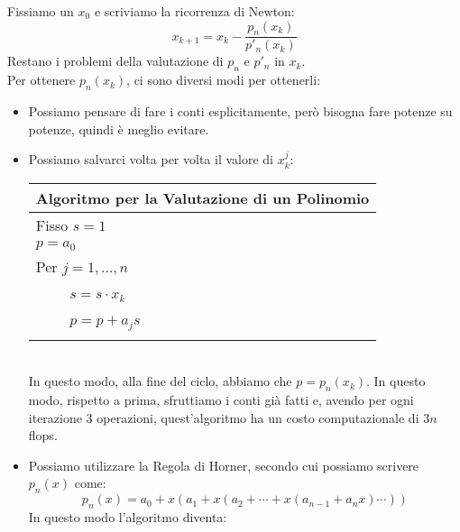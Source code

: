 \documentclass[11pt,a4paper,twoside]{article}
\theoremstyle{definition}
\begin{document}
Fissiamo un $x_0$ e scriviamo la ricorrenza di Newton:
\[ x_{k+1} = x_k - \frac{p_n(x_k)}{p'_n(x_k)} \]
Restano i problemi della valutazione di $p_n$ e $p'_n$ in $x_k$.\\
Per ottenere $p_n(x_k)$, ci sono diversi modi per ottenerli:
\begin{itemize}
	\item Possiamo pensare di fare i conti esplicitamente, però bisogna fare potenze su potenze, quindi è meglio evitare.
	\item Possiamo salvarci volta per volta il valore di $x_k^j$:

		\begin{tabular}{l}
		\\
		\textbf{Algoritmo per la Valutazione di un Polinomio}\\
		\hline
		Fisso $s = 1$\\
		$p = a_0$\\
		Per $j = 1,...,n$\\
		$\qquad$ $s = s \cdot x_k$\\
		$\qquad$ $p = p + a_js$\\
		\\
		\end{tabular}\\
		In questo modo, alla fine del ciclo, abbiamo che $p = p_n(x_k)$. In questo modo, rispetto a prima, sfruttiamo i conti già fatti e, avendo per ogni iterazione $3$ operazioni, quest'algoritmo ha un costo computazionale di $3n$ flops.
	\item Possiamo utilizzare la Regola di Horner, secondo cui possiamo scrivere $p_n(x)$ come:
		\[ p_n(x) = a_0 + x(a_1 + x(a_2 + \cdots + x(a_{n-1} + a_nx)\cdots )) \]
		In questo modo l'algoritmo diventa:


\end{itemize}
\end{document}
